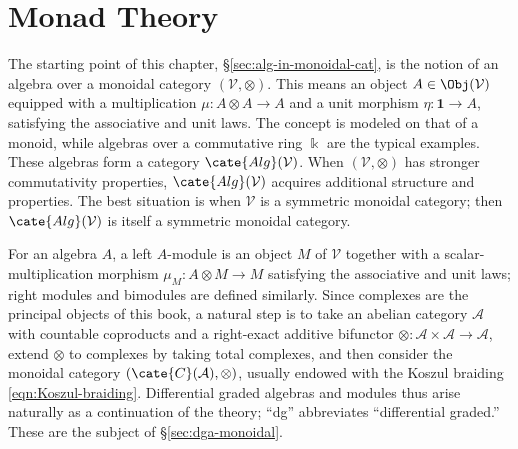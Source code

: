 
\chapter{Monad Theory}\label{sec:monads}
\hypertarget{o014.aljabr2.chapter7.monoidal-algebras}{ }

The starting point of this chapter, \S\ref{sec:alg-in-monoidal-cat}, is the
notion of an algebra over a monoidal category $(\mathcal{V},\otimes)$. This
means an object $A\in\Obj(\mathcal{V})$ equipped with a multiplication
$\mu:A\otimes A\to A$ and a unit morphism $\eta:\mathbf{1}\to A$, satisfying
the associative and unit laws. The concept is modeled on that of a monoid,
while algebras over a commutative ring $\Bbbk$ are the typical examples.
These algebras form a category $\cate{Alg}(\mathcal{V})$. When
$(\mathcal{V},\otimes)$ has stronger commutativity properties,
$\cate{Alg}(\mathcal{V})$ acquires additional structure and properties. The
best situation is when $\mathcal{V}$ is a symmetric monoidal category; then
$\cate{Alg}(\mathcal{V})$ is itself a symmetric monoidal category.

For an algebra $A$, a left $A$-module is an object $M$ of $\mathcal{V}$
together with a scalar-multiplication morphism $\mu_M:A\otimes M\to M$
satisfying the associative and unit laws; right modules and bimodules are
defined similarly. Since complexes are the principal objects of this book, a
natural step is to take an abelian category $\mathcal{A}$ with countable
coproducts and a right-exact additive bifunctor
$\otimes:\mathcal{A}\times\mathcal{A}\to\mathcal{A}$, extend $\otimes$ to
complexes by taking total complexes, and then consider the monoidal category
$(\cate{C}(\mathcal{A}),\otimes)$, usually endowed with the Koszul braiding
\eqref{eqn:Koszul-braiding}. Differential graded algebras and modules thus
arise naturally as a continuation of the theory; “dg” abbreviates
“differential graded.” These are the subject of \S\ref{sec:dga-monoidal}.

